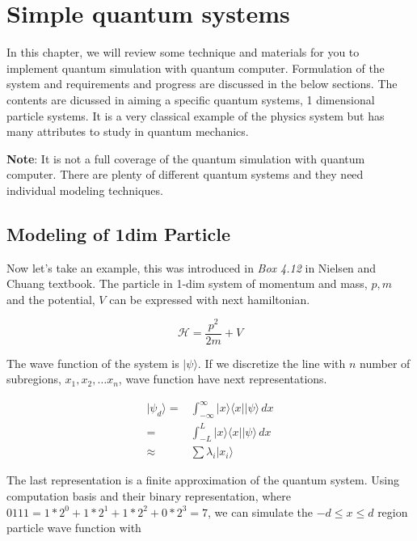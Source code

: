 \chapter{Simple quantum systems}

In this chapter, we will review some technique and materials 
for you to implement quantum simulation with quantum computer.
Formulation of the system and requirements and progress are discussed 
in the below sections.
The contents are dicussed in aiming a specific quantum systems,
1 dimensional particle systems.
It is a very classical example of the physics system but
has many attributes to study in quantum mechanics.

\textbf{Note}: It is not a full coverage of the quantum simulation with 
quantum computer. There are plenty of different quantum systems and 
they need individual modeling techniques.


\section{Modeling of 1dim Particle}
\label{sec:simulation}

Now let's take an example, this was introduced in \textit{Box 4.12} in Nielsen and Chuang textbook. 
The particle in 1-dim system of momentum and mass, $p, m$ and the potential, $V$ can be expressed with next hamiltonian.

\begin{equation}
    \mathcal{H} = \frac{p^2}{2 m} + V
\end{equation}

The wave function of the system is $| \psi \rangle$. 
If we discretize the line with $n$ number of subregions, $x_1, x_2, \dots x_n$, 
wave function have next representations.

\begin{align}
    | \psi _d \rangle =& \int_{-\infty}^\infty |x \rangle \langle x| | \psi \rangle \, dx \\
                      =& \int_{-L}^L |x \rangle \langle x| | \psi \rangle \, dx \\
                      \approx& \sum \lambda_i | x_i \rangle
\end{align}

The last representation is a finite approximation of the quantum system.
Using computation basis and their binary representation, where $0111 = 1*2^0 + 1*2^1 + 1*2^2 + 0*2^3 = 7$,
we can simulate the $-d \leq x \leq d$ region particle wave function with 

